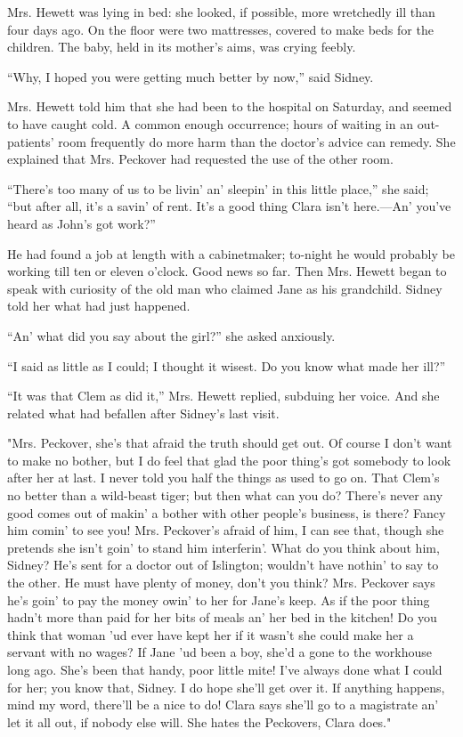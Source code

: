 Mrs. Hewett was lying in bed: she looked, if possible, more wretchedly
ill than four days ago. On the floor were two mattresses, covered to
make beds for the children. The baby, held in its mother's aims, was
crying feebly.

``Why, I hoped you were getting much better by now,'' said Sidney.

Mrs. Hewett told him that she had been to the hospital on Saturday, and
seemed to have caught cold. A common enough occurrence; hours of waiting
in an out-patients' {}room frequently do more harm than the doctor's
advice can remedy. She explained that Mrs. Peckover had requested the
use of the other room.

``There's too many of us to be livin' an' sleepin' in this little
place,'' she said; ``but after all, it's a savin' of rent. It's a good
thing Clara isn't here.---An' you've heard as John's got work?''

He had found a job at length with a cabinetmaker; to-night he would
probably be working till ten or eleven o'clock. Good news so far. Then
Mrs. Hewett began to speak with curiosity of the old man who claimed
Jane as his grandchild. Sidney told her what had just happened.

``An' what did you say about the girl?'' she asked anxiously.

``I said as little as I could; I thought it wisest. Do you know what
made her ill?''

``It was that Clem as did it,'' Mrs. Hewett replied, subduing her voice.
And she related what had befallen after Sidney's last visit.

"Mrs. Peckover, she's that afraid the truth {}should get out. Of course
I don't want to make no bother, but I do feel that glad the poor thing's
got somebody to look after her at last. I never told you half the things
as used to go on. That Clem's no better than a wild-beast tiger; but
then what can you do? There's never any good comes out of makin' a
bother with other people's business, is there? Fancy him comin' to see
you! Mrs. Peckover's afraid of him, I can see that, though she pretends
she isn't goin' to stand him interferin'. What do you think about him,
Sidney? He's sent for a doctor out of Islington; wouldn't have nothin'
to say to the other. He must have plenty of money, don't you think? Mrs.
Peckover says he's goin' to pay the money owin' to her for Jane's keep.
As if the poor thing hadn't more than paid for her bits of meals an' her
bed in the kitchen! Do you think that woman 'ud ever have kept her if it
wasn't she could make her a servant with no wages? If Jane 'ud been a
boy, she'd a gone to the workhouse long ago. She's been that handy,
{}poor little mite! I've always done what I could for her; you know
that, Sidney. I do hope she'll get over it. If anything happens, mind my
word, there'll be a nice to do! Clara says she'll go to a magistrate an'
let it all out, if nobody else will. She hates the Peckovers, Clara
does."

